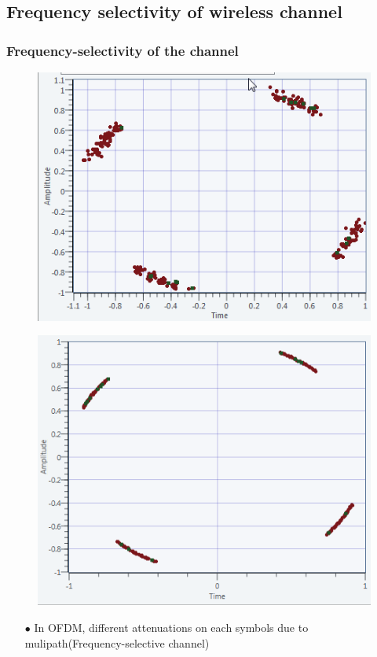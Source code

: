 \documentclass[11pt]{beamer}
\begin{document}
\subsection{Frequency selectivity of wireless channel}
\begin{frame}
\frametitle{Frequency-selectivity of the channel}

\begin{figure}[!ht]
    \begin{minipage}[b]{0.48\linewidth}
        \centering \includegraphics[scale=0.41]{img/multicarrier_200hz.png}
     \label{fig6}
    \end{minipage}\hfill
    \begin{minipage}[b]{0.48\linewidth}
         \centering \includegraphics[scale=0.35]{img/SingleCarrier_Offset_200}
\label{fig7}
    \end{minipage}
\end{figure}

\begin{itemize}
\item[$\bullet$] In OFDM, different attenuations on each symbols due to mulipath(Frequency-selective channel)
\end{itemize}
\end{frame}
\end{document}
